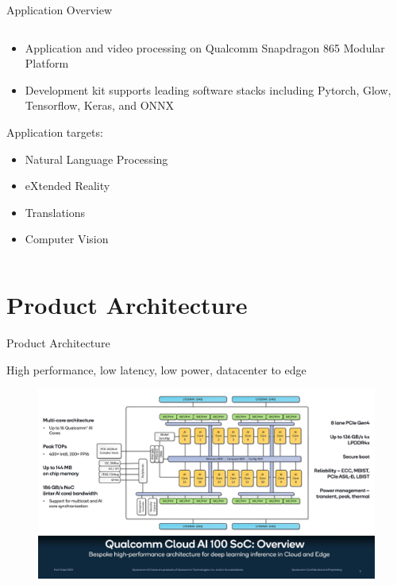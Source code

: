 \documentclass[12pt]{beamer}
\begin{document}
\begin{frame}{Application Overview}
\begin{columns}
\begin{column}{0.5\linewidth}
\begin{itemize}
                \item Application and video processing on Qualcomm Snapdragon 865 Modular Platform
                \item Development kit supports leading software stacks including Pytorch, Glow, Tensorflow, Keras, and ONNX \cite{qualcomm}
            \end{itemize}
            Application targets:
            \begin{itemize}
                \item Natural Language Processing
                \item eXtended Reality
                \item Translations
                \item Computer Vision
            \end{itemize}
        \end{column}
    \end{columns}
\end{frame}
\section{Product Architecture}
\begin{frame}{Product Architecture}
    \begin{center}
        High performance, low latency, low power, datacenter to edge
    \end{center}
    \begin{figure}[H]
        \centering
        \includegraphics[width=1\textwidth]{1.jpg}
    \end{figure}
\end{frame}
\end{document}
